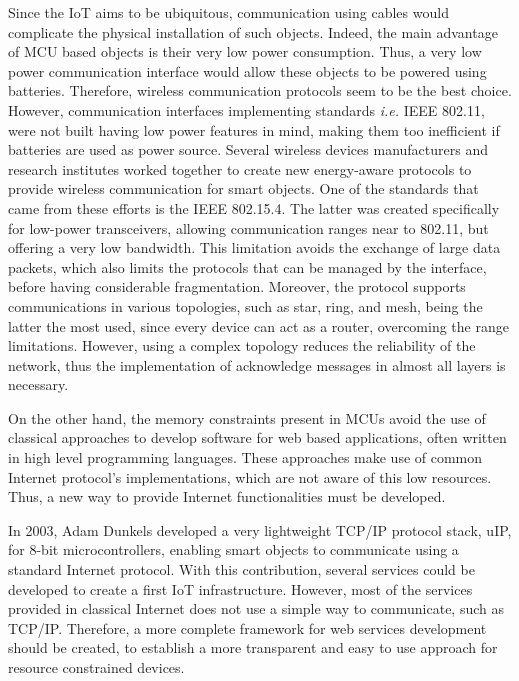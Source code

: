 Since the IoT aims to be ubiquitous, communication using cables would complicate the physical installation of such objects.
Indeed, the main advantage of MCU based objects is their very low power consumption.
Thus, a very low power communication interface would allow these objects to be powered using batteries.
Therefore, wireless communication protocols seem to be the best choice.
However, communication interfaces implementing standards \textit{i.e.} IEEE 802.11, were not built having low power features in mind, making them too inefficient if batteries are used as power source.
Several wireless devices manufacturers and research institutes worked together to create new energy-aware protocols to provide wireless communication for smart objects.
One of the standards that came from these efforts is the IEEE 802.15.4\cite{ieee802.15.4}.
The latter was created specifically for low-power transceivers, allowing communication ranges near to 802.11, but offering a very low bandwidth.
This limitation avoids the exchange of large data packets, which also limits the protocols that can be managed by the interface, before having considerable fragmentation.
Moreover, the protocol supports communications in various topologies, such as star, ring, and mesh, being the latter the most used, since every device can act as a router, overcoming the range limitations.
However, using a complex topology reduces the reliability of the network, thus the implementation of acknowledge messages in almost all layers is necessary.


On the other hand, the memory constraints present in MCUs avoid the use of classical approaches to develop software for web based applications, often written in high level programming languages.
These approaches make use of common Internet protocol's implementations, which are not aware of this low resources.
Thus, a new way to provide Internet functionalities must be developed.

In 2003, Adam Dunkels developed a very lightweight TCP/IP protocol stack, uIP\cite{dunkels03full}, for 8-bit microcontrollers, enabling smart objects to communicate using a standard Internet protocol.
With this contribution, several services could be developed to create a first IoT infrastructure.
However, most of the services provided in classical Internet does not use a simple way to communicate, such as TCP/IP.
Therefore, a more complete framework for web services development should be created, to establish a more transparent and easy to use approach for resource constrained devices.

